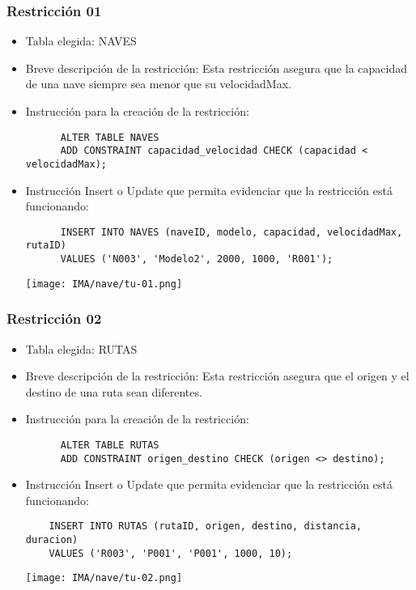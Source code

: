 \subsubsection*{Restricción 01}

\begin{itemize} 
  \item Tabla elegida: NAVES 
  \item Breve descripción de la restricción: Esta restricción asegura que la capacidad de una nave siempre sea menor que su velocidadMax. 
  \item Instrucción para la creación de la restricción: 
    \begin{verbatim} 
      ALTER TABLE NAVES 
      ADD CONSTRAINT capacidad_velocidad CHECK (capacidad < velocidadMax); 
    \end{verbatim} 
  \item Instrucción Insert o Update que permita evidenciar que la restricción está funcionando: 
    \begin{verbatim} 
      INSERT INTO NAVES (naveID, modelo, capacidad, velocidadMax, rutaID) 
      VALUES ('N003', 'Modelo2', 2000, 1000, 'R001'); 
    \end{verbatim}
    \begin{center}
      \texttt{[image: IMA/nave/tu-01.png]}
    \end{center}
\end{itemize}


\subsubsection*{Restricción 02}

\begin{itemize} 
  \item Tabla elegida: RUTAS 
  \item Breve descripción de la restricción: Esta restricción asegura que el origen y el destino de una ruta sean diferentes. 
  \item Instrucción para la creación de la restricción: 
    \begin{verbatim} 
      ALTER TABLE RUTAS 
      ADD CONSTRAINT origen_destino CHECK (origen <> destino); 
    \end{verbatim} 
  \item Instrucción Insert o Update que permita evidenciar que la restricción está funcionando: 
    \begin{verbatim}
    INSERT INTO RUTAS (rutaID, origen, destino, distancia, duracion) 
    VALUES ('R003', 'P001', 'P001', 1000, 10);
    \end{verbatim}
    \begin{center}
      \texttt{[image: IMA/nave/tu-02.png]}
    \end{center}
\end{itemize}

